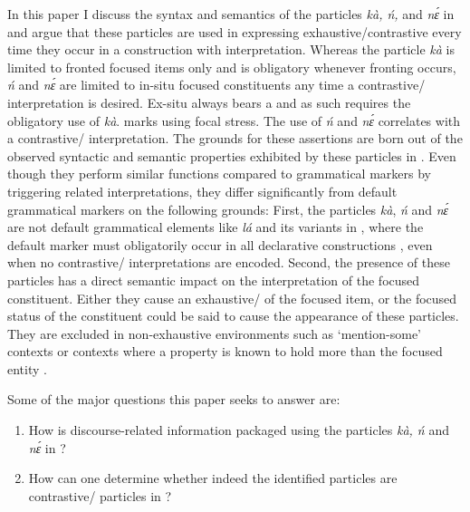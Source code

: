 \documentclass[output=paper,modfonts,nonflat,
\ChapterDOI{10.5281/zenodo.3367154}
 hidelinks
]{langsci/langscibook}
\begin{document}
In this paper I discuss the syntax and semantics of the particles \textit{kà, ń,} and \textit{nɛ́} in  and argue that these particles are used in expressing exhaustive{\slash}contrastive  every time they occur in a construction with  interpretation. Whereas the particle \textit{kà} is limited to fronted focused items only and is obligatory whenever fronting occurs, \textit{ń} and \textit{nɛ́} are limited to in-situ focused constituents any time a contrastive{\slash} interpretation is desired. Ex-situ  always bears a  and as such requires the obligatory use of \textit{kà}.  marks  using focal stress. The use of \textit{ń} and \textit{nɛ́} correlates with a contrastive{\slash} interpretation. The grounds for these assertions are born out of the observed syntactic and semantic properties exhibited by these particles in . Even though they perform similar functions compared to grammatical  markers by triggering  related interpretations, they differ significantly from default grammatical  markers on the following grounds: First, the particles \textit{kà}, \textit{ń} and \textit{nɛ́} are not default grammatical  elements like \textit{lá} and its variants in , where the default  marker must obligatorily occur in all declarative constructions \citep{Bodomo1997}, even when no contrastive{\slash} interpretations are encoded. Second, the presence of these particles has a direct semantic impact on the interpretation of the focused constituent. Either they cause an exhaustive/ of the focused item, or the focused status of the constituent could be said to cause the appearance of these particles. They are excluded in non-exhaustive environments such as ‘mention-some’ contexts or contexts where a property is known to hold more than the focused entity \citep[242]{hartmann2007}. 

Some of the major questions this paper seeks to answer are:
\begin{enumerate}
\item How is discourse-related information packaged using the particles \textit{kà, ń} and \textit{nɛ́} in ? 
\item How can one determine whether indeed the identified particles are contrastive{\slash} particles in ? 
\end{enumerate}
\end{document}
